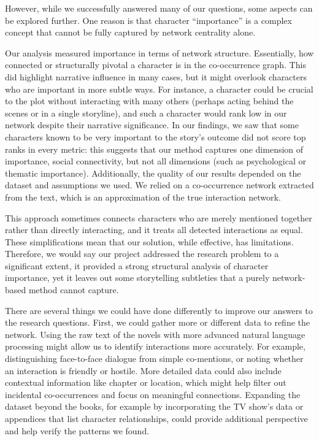\documentclass[12pt, a4paper]{article}
\begin{document}
However, while we successfully answered many of our questions, some aspects can be explored further.
One reason is that character “importance” is a complex concept that cannot be fully captured by network centrality alone. 

Our analysis measured importance in terms of network structure. Essentially, how connected or structurally pivotal a character 
is in the co-occurrence graph. This did highlight narrative influence in many cases, but it might overlook characters who are important in more subtle ways. 
For instance, a character could be crucial to the plot without interacting with many others (perhaps acting behind the scenes or in a single storyline), 
and such a character would rank low in our network despite their narrative significance. In our findings, we saw that some characters known to be very 
important to the story’s outcome did not score top ranks in every metric: this suggests that our method captures one dimension of importance,
social connectivity, but not all dimensions (such as psychological or thematic importance). Additionally, the quality of our results depended 
on the dataset and assumptions we used. We relied on a co-occurrence network extracted from the text, which is an approximation of the true interaction network.
 
This approach sometimes connects characters who are merely mentioned together rather than directly interacting, and it treats all detected interactions as
  equal. These simplifications mean that our solution, while effective, has limitations. Therefore, we would say our project addressed the 
  research problem to a significant extent, it provided a strong structural analysis of character importance, 
  yet it leaves out some storytelling subtleties that a purely network-based method cannot capture.

There are several things we could have done differently to improve our answers to the research questions. 
First, we could gather more or different data to refine the network. 
Using the raw text of the novels with more advanced natural language processing might allow us to identify 
interactions more accurately. 
For example, distinguishing face-to-face dialogue from simple co-mentions, 
or noting whether an interaction is friendly or hostile. 
More detailed data could also include contextual information like chapter or location, 
which might help filter out incidental co-occurrences and focus on meaningful connections. 
Expanding the dataset beyond the books, for example by incorporating the TV show’s data or appendices that list character relationships,
could provide additional perspective and help verify the patterns we found. 
\end{document}
